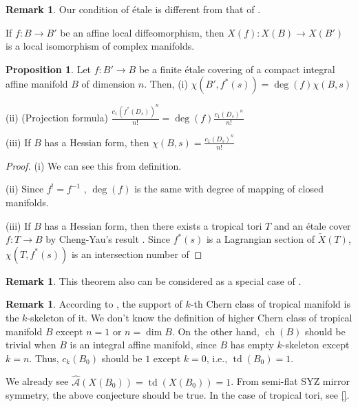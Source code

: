 \documentclass[a4paper,dvipdfmx,reqno,12pt]{amsart}
\theoremstyle{definition}
\newtheorem{Prop}[Thm]{Proposition}
\newtheorem{Rmk}[Thm]{Remark}
\newcommand{\mcal}[1]{\mathcal{#1}}%
\newcommand{\opn}[1]{\operatorname{#1}}
\numberwithin{equation}{section}
\begin{document}
\begin{Rmk}
Our condition of \'etale is different from that of 
\cite[Definition 1.1]{grossMirrorSymmetryLogarithmic2006a}.

If $f\colon B\to B'$ be an affine local diffeomorphism,
then $X(f)\colon X(B) \to X(B')$ is a local isomorphism of
complex manifolds.
\end{Rmk}

\begin{Prop}
Let $f:B'\to B$ be a finite \'etale covering of a compact integral affine 
manifold $B$ of dimension $n$. Then,
(i) $\chi(B',f^{*}(s))=\opn{deg}(f)\chi(B,s)$

(ii) (Projection formula) 
$\frac{c_1(f^{*}(D_s))^{n}}{n!}=\opn{deg}(f)\frac{c_1(D_s)^{n}}{n!}$

(iii) If $B$ has a Hessian form, then $\chi(B,s)=\frac{c_1(D_s)^{n}}{n!}$
\end{Prop}

\begin{proof}
(i) We can see this from definition.

(ii) Since $f^{!}=f^{-1}$ 
\cite[]{iversenCohomologySheaves1986a}
, $\opn{deg}(f)$ is the same with degree of 
mapping of closed manifolds.

(iii) If $B$ has a Hessian form, then there exists a tropical tori $T$
and an \'etale cover $f\colon T\to B$ by Cheng-Yau's result
\cite{MR714338}. Since $f^{*}(s)$ is a Lagrangian section
of $\check{X}(T)$, $\chi(T,f^{*}(s))$ is an intersection
number of
\end{proof}

\begin{Rmk} \label{rmk: integral_mirror}
This theorem also can be considered as a special case of \cite{MR4301560}.
\end{Rmk}

\begin{Rmk}

According to \cite[5.3]{mikhalkinTropicalGeometryIts2006},
the support of $k$-th Chern class of tropical manifold is 
the $k$-skeleton of it.
We don't know the definition of higher Chern class of tropical manifold $B$ except
$n=1$ or $n=\dim B$. 
On the other hand, $\opn{ch}(B)$ should be trivial when $B$ is
an integral affine manifold, since $B$ has empty
$k$-skeleton except $k=n$.
Thus, $c_{k}(B_0)$ should be $1$ except $k=0$, 
i.e., $\opn{td}(B_0)=1$. 

We already see $\hat{\mcal{A}}(X(B_0))=\opn{td}(X(B_0))=1$.
    From semi-flat SYZ mirror symmetry, the above conjecture should be true. In the case of tropical tori, see \ref{}.
\end{Rmk}
\end{document}
